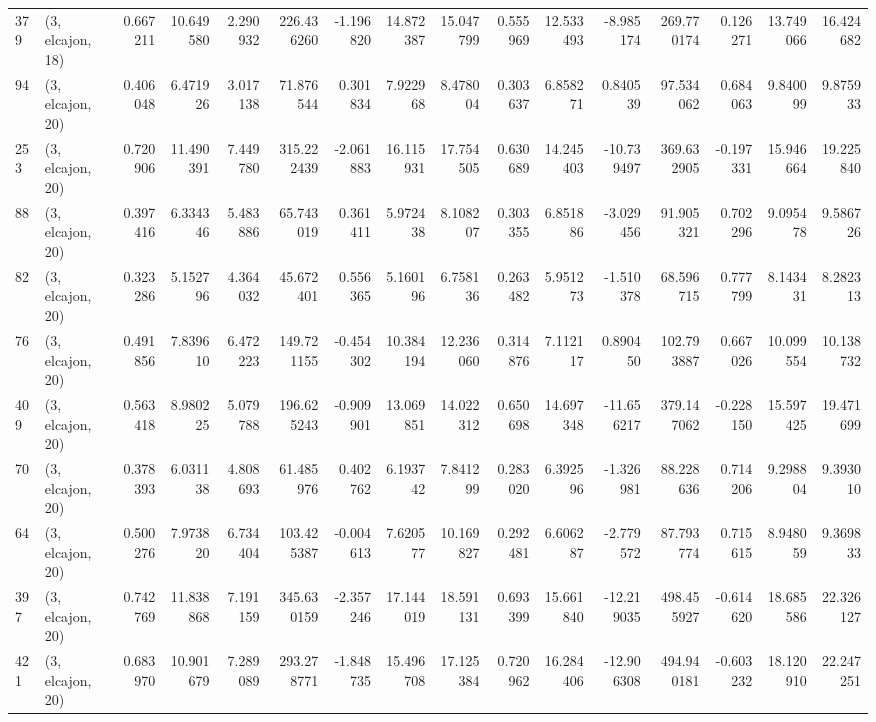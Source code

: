 \begin{tabular}{llrrrrrrrrrrrrrr}
379 &  (3, elcajon, 18) &   0.667211 &  10.649580 &   2.290932 &   226.436260 &  -1.196820 &  14.872387 &  15.047799 &  0.555969 &  12.533493 &  -8.985174 &   269.770174 &  0.126271 &  13.749066 &  16.424682 \\
94  &  (3, elcajon, 20) &   0.406048 &   6.471926 &   3.017138 &    71.876544 &   0.301834 &   7.922968 &   8.478004 &  0.303637 &   6.858271 &   0.840539 &    97.534062 &  0.684063 &   9.840099 &   9.875933 \\
253 &  (3, elcajon, 20) &   0.720906 &  11.490391 &   7.449780 &   315.222439 &  -2.061883 &  16.115931 &  17.754505 &  0.630689 &  14.245403 & -10.739497 &   369.632905 & -0.197331 &  15.946664 &  19.225840 \\
88  &  (3, elcajon, 20) &   0.397416 &   6.334346 &   5.483886 &    65.743019 &   0.361411 &   5.972438 &   8.108207 &  0.303355 &   6.851886 &  -3.029456 &    91.905321 &  0.702296 &   9.095478 &   9.586726 \\
82  &  (3, elcajon, 20) &   0.323286 &   5.152796 &   4.364032 &    45.672401 &   0.556365 &   5.160196 &   6.758136 &  0.263482 &   5.951273 &  -1.510378 &    68.596715 &  0.777799 &   8.143431 &   8.282313 \\
76  &  (3, elcajon, 20) &   0.491856 &   7.839610 &   6.472223 &   149.721155 &  -0.454302 &  10.384194 &  12.236060 &  0.314876 &   7.112117 &   0.890450 &   102.793887 &  0.667026 &  10.099554 &  10.138732 \\
409 &  (3, elcajon, 20) &   0.563418 &   8.980225 &   5.079788 &   196.625243 &  -0.909901 &  13.069851 &  14.022312 &  0.650698 &  14.697348 & -11.656217 &   379.147062 & -0.228150 &  15.597425 &  19.471699 \\
70  &  (3, elcajon, 20) &   0.378393 &   6.031138 &   4.808693 &    61.485976 &   0.402762 &   6.193742 &   7.841299 &  0.283020 &   6.392596 &  -1.326981 &    88.228636 &  0.714206 &   9.298804 &   9.393010 \\
64  &  (3, elcajon, 20) &   0.500276 &   7.973820 &   6.734404 &   103.425387 &  -0.004613 &   7.620577 &  10.169827 &  0.292481 &   6.606287 &  -2.779572 &    87.793774 &  0.715615 &   8.948059 &   9.369833 \\
397 &  (3, elcajon, 20) &   0.742769 &  11.838868 &   7.191159 &   345.630159 &  -2.357246 &  17.144019 &  18.591131 &  0.693399 &  15.661840 & -12.219035 &   498.455927 & -0.614620 &  18.685586 &  22.326127 \\
421 &  (3, elcajon, 20) &   0.683970 &  10.901679 &   7.289089 &   293.278771 &  -1.848735 &  15.496708 &  17.125384 &  0.720962 &  16.284406 & -12.906308 &   494.940181 & -0.603232 &  18.120910 &  22.247251 \\

\end{tabular}
